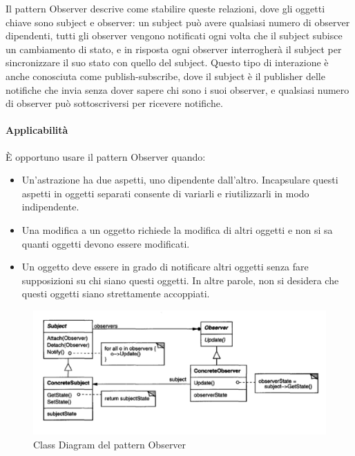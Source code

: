 Il pattern Observer descrive come stabilire queste relazioni, dove gli oggetti chiave sono subject e observer: un subject può avere qualsiasi numero di observer dipendenti, tutti gli observer vengono notificati ogni volta che il subject subisce un cambiamento di stato, e in risposta ogni observer interrogherà il subject per sincronizzare il suo stato con quello del subject. Questo tipo di interazione è anche conosciuta come publish-subscribe, dove il subject è il publisher delle notifiche che invia senza dover sapere chi sono i suoi observer, e qualsiasi numero di observer può sottoscriversi per ricevere notifiche.

\newpage

\paragraph{Applicabilità} È opportuno usare il pattern Observer quando:
\begin{itemize}
    \item Un'astrazione ha due aspetti, uno dipendente dall'altro. Incapsulare questi aspetti in oggetti separati consente di variarli e riutilizzarli in modo indipendente.
    \item Una modifica a un oggetto richiede la modifica di altri oggetti e non si sa quanti oggetti devono essere modificati.
    \item Un oggetto deve essere in grado di notificare altri oggetti senza fare supposizioni su chi siano questi oggetti. In altre parole, non si desidera che questi oggetti siano strettamente accoppiati.
\end{itemize}

\begin{figure}[H]
    \centering
    \includegraphics[width=0.75\linewidth]{assets/pattern/observer/observer-struttura.png}
    \caption{Class Diagram del pattern Observer}
\end{figure}

